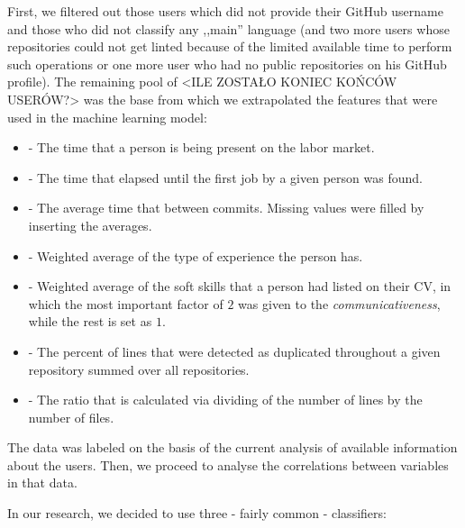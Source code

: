 First, we filtered out those users which did not provide their GitHub username and those who did not classify any ,,main'' language (and two more users whose repositories could not get linted because of the limited available time to perform such operations or one more user who had no public repositories on his GitHub profile). The remaining pool of <ILE ZOSTAŁO KONIEC KOŃCÓW USERÓW?> was the base from which we extrapolated the features that were used in the machine learning model:

\begin{itemize}
  \item {} - The time that a person is being present on the labor market.
  \item {} - The time that elapsed until the first job by a given person was found.
  \item {} - The average time that between commits. Missing values were filled by inserting the averages.
  \item {} - Weighted average of the type of experience the person has.
  \item {} - Weighted average of the soft skills that a person had listed on their CV, in which the most important factor of $2$ was given to the \emph{communicativeness}, while the rest is set as $1$. 
  \item {} - The percent of lines that were detected as duplicated throughout a given repository summed over all repositories.
  \item {} - The ratio that is calculated via dividing of the number of lines by the number of files.
\end{itemize}

The data was labeled on the basis of the current analysis of available information about the users. Then, we proceed to analyse the correlations between variables in that data.

In our research, we decided to use three - fairly common - classifiers:

